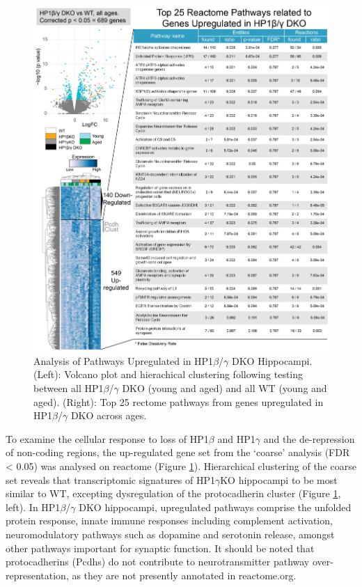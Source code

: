 \documentclass[onehalf,12pt]{beavtex}
\begin{document}
  \begin{figure}
  
  {\centering \includegraphics[width=1\linewidth, ]{./figure/results/reactome_out} 
  
  }
  
  \caption[Analysis of Pathways Upregulated in HP1$\beta$/$\gamma$ DKO Hippocampi]{Analysis of Pathways Upregulated in HP1$\beta$/$\gamma$ DKO Hippocampi.  (Left): Volcano plot and hierachical clustering following testing between all HP1$\beta$/$\gamma$ DKO (young and aged) and all WT (young and aged).  (Right): Top 25 rectome pathways from genes upregulated in HP1$\beta$/$\gamma$ DKO across ages.}\label{fig:reactome}
  \end{figure}
  
  To examine the cellular response to loss of HP1\(\beta\) and
  HP1\(\gamma\) and the de-repression of non-coding regions, the
  up-regulated gene set from the `coarse' analysis (FDR \textless{} 0.05)
  was analysed on reactome (Figure \ref{fig:reactome}). Hierarchical
  clustering of the coarse set reveals that transcriptomic signatures of
  HP1\(\gamma\)KO hippocampi to be most similar to WT, excepting
  dysregulation of the protocadherin cluster (Figure \ref{fig:reactome},
  left). In HP1\(\beta\)/\(\gamma\) DKO hippocampi, upregulated pathways
  comprise the unfolded protein response, innate immune responses
  including complement activation, neuromodulatory pathways such as
  dopamine and serotonin release, amongst other pathways important for
  synaptic function. It should be noted that protocadherins (Pcdhs) do not
  contribute to neurotransmitter pathway over-representation, as they are
  not presently annotated in reactome.org.
  
\end{document}
